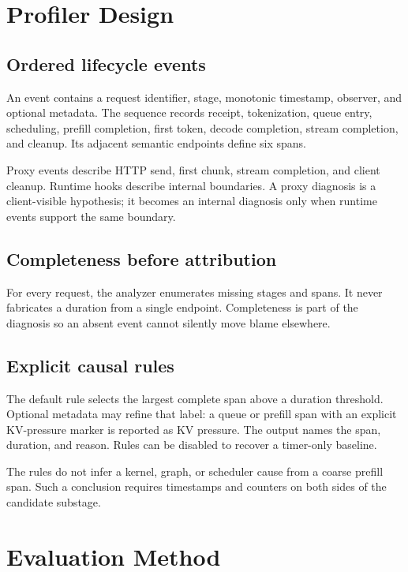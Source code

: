 \documentclass[sigconf,screen,nonacm]{acmart}
\begin{document}
\section{Profiler Design}

\subsection{Ordered lifecycle events}

An event contains a request identifier, stage, monotonic timestamp, observer,
and optional metadata. The sequence records receipt, tokenization, queue entry,
scheduling, prefill completion, first token, decode completion, stream
completion, and cleanup. Its adjacent semantic endpoints define six spans.

Proxy events describe HTTP send, first chunk, stream completion, and client
cleanup. Runtime hooks describe internal boundaries. A proxy diagnosis is a
client-visible hypothesis; it becomes an internal diagnosis only when runtime
events support the same boundary.

\subsection{Completeness before attribution}

For every request, the analyzer enumerates missing stages and spans. It never
fabricates a duration from a single endpoint. Completeness is part of the
diagnosis so an absent event cannot silently move blame elsewhere.

\subsection{Explicit causal rules}

The default rule selects the largest complete span above a duration threshold.
Optional metadata may refine that label: a queue or prefill span with an
explicit KV-pressure marker is reported as KV pressure. The output names the
span, duration, and reason. Rules can be disabled to recover a timer-only
baseline.

The rules do not infer a kernel, graph, or scheduler cause from a coarse
prefill span. Such a conclusion requires timestamps and counters on both sides
of the candidate substage.

\section{Evaluation Method}
\label{sec:method}
\end{document}
